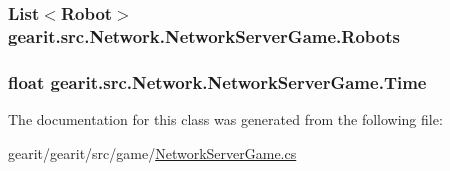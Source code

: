 \hypertarget{classgearit_1_1src_1_1_network_1_1_network_server_game_a5fe67a60f0804da174020fbad53a77f8}{
\subsubsection[{Robots}]{\setlength{\rightskip}{0pt plus 5cm}List$<${\bf Robot}$>$ gearit.\+src.\+Network.\+Network\+Server\+Game.\+Robots\hspace{0.3cm}{\ttfamily [get]}}}\label{classgearit_1_1src_1_1_network_1_1_network_server_game_a5fe67a60f0804da174020fbad53a77f8}
\hypertarget{classgearit_1_1src_1_1_network_1_1_network_server_game_a86301a5c4b97fd7306a5c59e777e0a8d}{
\subsubsection[{Time}]{\setlength{\rightskip}{0pt plus 5cm}float gearit.\+src.\+Network.\+Network\+Server\+Game.\+Time\hspace{0.3cm}{\ttfamily [get]}}}\label{classgearit_1_1src_1_1_network_1_1_network_server_game_a86301a5c4b97fd7306a5c59e777e0a8d}


The documentation for this class was generated from the following file\+:\begin{DoxyCompactItemize}
\item 
gearit/gearit/src/game/\hyperlink{_network_server_game_8cs}{Network\+Server\+Game.\+cs}\end{DoxyCompactItemize}
